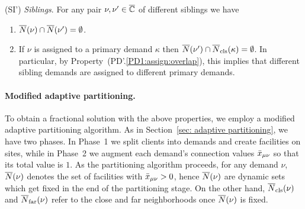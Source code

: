 \begin{description}
\begin{enumerate}
	\end{enumerate}
	
\item{(SI')} \emph{Siblings}. For any pair $\nu,\nu'\in\overline{\mathbb{C}}$ of different siblings we have
  \begin{enumerate}

	\item \label{SI1:siblings disjoint}
		  ${\overline{N}}(\nu)\cap {\overline{N}}(\nu') = \emptyset$.
		
	\item \label{SI1:primary disjoint} If $\nu$ is assigned to a primary demand $\kappa$ then
 		${\overline{N}}(\nu')\cap {\overline{N}}_{\text{cls}}(\kappa) = \emptyset$. In particular, by Property~(PD'.\ref{PD1:assign:overlap}),
		this implies that different sibling demands are assigned to different primary demands.

	\end{enumerate}
	
\end{description}


\paragraph{Modified adaptive partitioning.}
To obtain a fractional solution with the above properties,
we employ a modified adaptive partitioning algorithm. As
in Section~\ref{sec: adaptive partitioning}, we have two phases.
In Phase~1 we split clients into demands and create facilities on
sites, while in Phase~2 we augment each demand's
connection values ${\bar x}_{\mu\nu}$ so that its total value is $1$. As
the partitioning algorithm proceeds, for any demand $\nu$,
${\overline{N}}(\nu)$ denotes the set of facilities with ${\bar x}_{\mu\nu} > 0$,
hence ${\overline{N}}(\nu)$ are dynamic sets which get fixed in the end of the
partitioning stage. On the other hand, ${\overline{N}}_{\text{cls}}(\nu)$ and
${\overline{N}}_{\text{far}}(\nu)$ refer to the close and far neighborhoods once
${\overline{N}}(\nu)$ is fixed.

